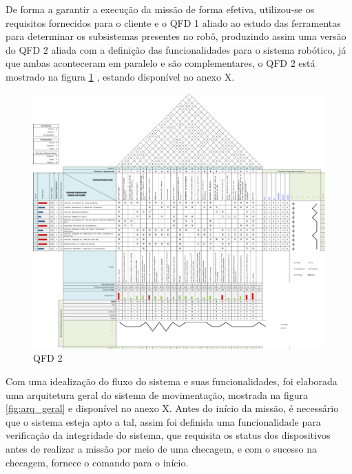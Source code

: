 De forma a garantir a execução da missão de forma efetiva, utilizou-se os requisitos fornecidos para o cliente e o QFD 1 aliado ao estudo das ferramentas para determinar os subsistemas presentes no robô, produzindo assim uma versão do QFD 2 aliada com a definição das funcionalidades para o sistema robótico, já que ambas aconteceram em paralelo e são complementares, o QFD 2 está mostrado na figura \ref{fig:qfd2} , estando disponível no anexo X.

\begin{figure}[H]
	\centering
	\includegraphics[scale=1]{Figures/qfdelir-2.png}
	\caption{QFD 2}
	\label{fig:qfd2}
\end{figure}

Com uma idealização do fluxo do sistema e suas funcionalidades, foi elaborada uma arquitetura geral do sistema de movimentação, mostrada na figura \ref{fig:arq_geral} e disponível no anexo X.  Antes do início da missão, é necessário que o sistema esteja apto a tal, assim foi definida uma funcionalidade para verificação da integridade do sistema, que requisita os status dos dispositivos antes de realizar a missão por meio de uma checagem, e com o sucesso na checagem, fornece o comando para o início.

